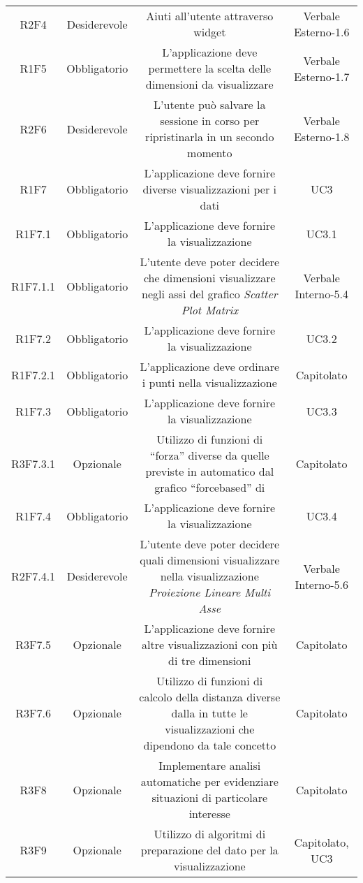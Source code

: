 \begin{center}
\begin{longtable}{C{\colA} C{\colB} C{\colC} C{\colA}}
R2F4 & Desiderevole & Aiuti all'utente attraverso widget & Verbale Esterno-1.6 \\
R1F5 & Obbligatorio & L'applicazione deve permettere la scelta delle dimensioni da visualizzare & Verbale Esterno-1.7\\
R2F6 & Desiderevole & L'utente può salvare la sessione in corso per ripristinarla in un secondo momento & Verbale Esterno-1.8\\
R1F7 & Obbligatorio & L'applicazione deve fornire diverse visualizzazioni per i dati & UC3\\
R1F7.1 & Obbligatorio & L'applicazione deve fornire la visualizzazione  & UC3.1\\
R1F7.1.1 & Obbligatorio & L'utente deve poter decidere che dimensioni visualizzare negli assi del grafico \textit{Scatter Plot Matrix} & Verbale Interno-5.4\\
R1F7.2 & Obbligatorio & L'applicazione deve fornire la visualizzazione  & UC3.2\\
R1F7.2.1 & Obbligatorio & L'applicazione deve ordinare i punti nella visualizzazione  & Capitolato \\
R1F7.3 & Obbligatorio & L'applicazione deve fornire la visualizzazione  & UC3.3\\
R3F7.3.1 & Opzionale & Utilizzo di funzioni di “forza” diverse da quelle previste in automatico dal grafico “forcebased” di  & Capitolato\\
R1F7.4 & Obbligatorio & L'applicazione deve fornire la visualizzazione  & UC3.4 \\
R2F7.4.1 & Desiderevole & L'utente deve poter decidere quali dimensioni visualizzare nella visualizzazione \textit{Proiezione Lineare Multi Asse} & Verbale Interno-5.6\\
R3F7.5 & Opzionale & L'applicazione deve fornire altre visualizzazioni con più di tre dimensioni & Capitolato\\
R3F7.6 & Opzionale & Utilizzo di funzioni di calcolo della distanza diverse dalla  in tutte le visualizzazioni che dipendono da tale concetto & Capitolato \\
R3F8 & Opzionale & Implementare analisi automatiche per evidenziare situazioni di particolare interesse & Capitolato\\
R3F9 & Opzionale & Utilizzo di algoritmi di preparazione del dato per la visualizzazione & Capitolato, UC3\\

\end{longtable}
\end{center}
